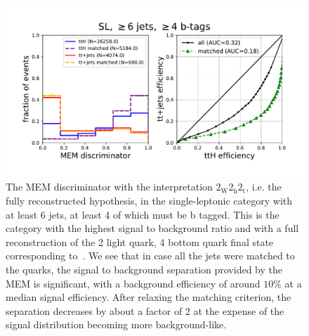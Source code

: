 \begin{figure}
\begin{centering}
\includegraphics[width = 1.0\textwidth]{figures/mem_sl_jge6_tge4.pdf}
\caption{The MEM discriminator with the interpretation $2_{\mathrm{W}} 2_{\mathrm{h}} 2_{\mathrm{t}}$, i.e. the fully reconstructed hypothesis, in the single-leptonic category with at least 6 jets, at least 4 of which must be b tagged. This is the category with the highest signal to background ratio and with a full reconstruction of the 2 light quark, 4 bottom quark final state corresponding to~\ttHbb. We see that in case all the jets were matched to the quarks, the signal to background separation provided by the MEM is significant, with a background efficiency of around $10\%$ at a median signal efficiency. After relaxing the matching criterion, the separation decreases by about a factor of 2 at the expense of the signal distribution becoming more background-like.}
\label{fig:mem_sl_jge6_tge4}
\end{centering}
\end{figure}

